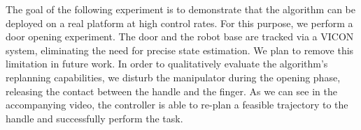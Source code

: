 The goal of the following experiment is to demonstrate that the algorithm can be deployed on a real platform at high control rates. For this purpose, we perform a door opening experiment. The door and the robot base are tracked via a VICON system, eliminating the need for precise state estimation. We plan to remove this limitation in future work. In order to qualitatively evaluate the algorithm's replanning capabilities, we disturb the manipulator during the opening phase, releasing the contact between the handle and the finger. As we can see in the accompanying video, the controller is able to re-plan a feasible trajectory to the handle and successfully perform the task. 

